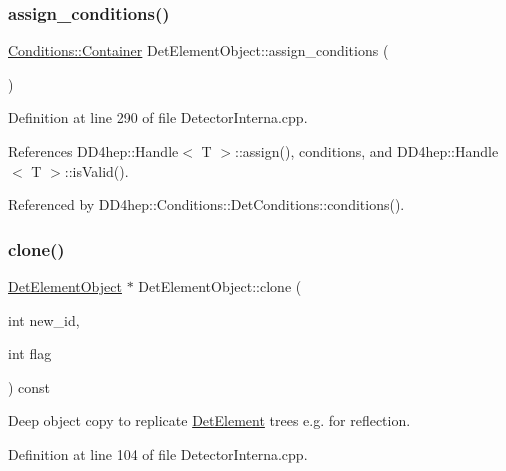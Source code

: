 \subsubsection{\texorpdfstring{assign\+\_\+conditions()}{assign\_conditions()}}
{\footnotesize\ttfamily \hyperlink{class_d_d4hep_1_1_conditions_1_1_container}{Conditions\+::\+Container} Det\+Element\+Object\+::assign\+\_\+conditions (\begin{DoxyParamCaption}{ }\end{DoxyParamCaption})}



Definition at line 290 of file Detector\+Interna.\+cpp.



References D\+D4hep\+::\+Handle$<$ T $>$\+::assign(), conditions, and D\+D4hep\+::\+Handle$<$ T $>$\+::is\+Valid().



Referenced by D\+D4hep\+::\+Conditions\+::\+Det\+Conditions\+::conditions().

\hypertarget{class_d_d4hep_1_1_geometry_1_1_det_element_object_aaf736c420acd42e2f8def1c9344709d6}{}\label{class_d_d4hep_1_1_geometry_1_1_det_element_object_aaf736c420acd42e2f8def1c9344709d6} 
\subsubsection{\texorpdfstring{clone()}{clone()}}
{\footnotesize\ttfamily \hyperlink{class_d_d4hep_1_1_geometry_1_1_det_element_object}{Det\+Element\+Object} $\ast$ Det\+Element\+Object\+::clone (\begin{DoxyParamCaption}\item[{int}]{new\+\_\+id,  }\item[{int}]{flag }\end{DoxyParamCaption}) const\hspace{0.3cm}{\ttfamily [virtual]}}



Deep object copy to replicate \hyperlink{class_d_d4hep_1_1_geometry_1_1_det_element}{Det\+Element} trees e.\+g. for reflection. 



Definition at line 104 of file Detector\+Interna.\+cpp.



